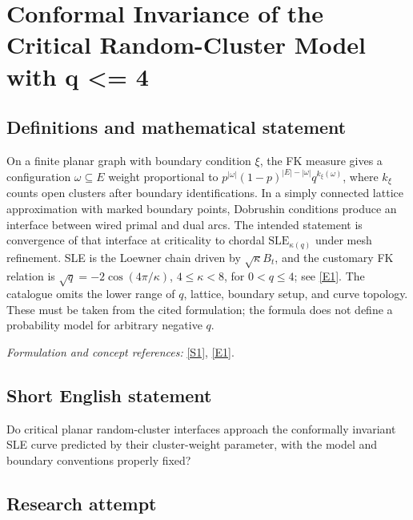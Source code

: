 \documentclass[11pt,a4paper]{article}
\newcommand{\sref}[2]{\hyperlink{source:#1:#2}{[S#2]}}
\newcommand{\eref}[2]{\hyperlink{extra:#1:#2}{[E#2]}}
\newif\ifshowcatalogue
\newcommand{\cataloguescope}[1]{\ifshowcatalogue
 \paragraph{Exact scope in the supplied catalogue.}
 \begin{quote}\small #1\end{quote}\fi}
\numberwithin{equation}{section}
\begin{document}
\setcounter{section}{0}
\clearpage
\section*{\texorpdfstring{Conformal Invariance of the Critical Random-Cluster Model with q <= 4}{Conformal Invariance of the Critical Random-Cluster Model with q <= 4}}\label{statement}
\subsection{Definitions and mathematical statement}
On a finite planar graph with boundary condition $\xi$, the FK measure gives a configuration $\omega\subseteq E$ weight proportional to
$p^{|\omega|}(1-p)^{|E|-|\omega|}q^{k_\xi(\omega)}$, where $k_\xi$ counts open clusters after boundary identifications. In a simply connected lattice approximation with marked boundary points, Dobrushin conditions produce an interface between wired primal and dual arcs. The intended statement is convergence of that interface at criticality to chordal $\mathrm{SLE}_{\kappa(q)}$ under mesh refinement. SLE is the Loewner chain driven by $\sqrt\kappa B_t$, and the customary FK relation is $\sqrt q=-2\cos(4\pi/\kappa)$, $4\le\kappa<8$, for $0<q\le4$; see \eref{statement}{1}. The catalogue omits the lower range of $q$, lattice, boundary setup, and curve topology. These must be taken from the cited formulation; the formula does not define a probability model for arbitrary negative $q$.
\par\smallskip\textit{Formulation and concept references:} \sref{statement}{1}, \eref{statement}{1}.
\cataloguescope{Prove that the exploration path of the critical random-cluster (FK) model with q <= 4 converges in distribution to a Schramm-Loewner evolution SLE\_\{kappa(q)\} as the mesh size goes to zero, i.e., the scaling limit is conformally invariant.}
\subsection{Short English statement}
Do critical planar random-cluster interfaces approach the conformally invariant SLE curve predicted by their cluster-weight parameter, with the model and boundary conventions properly fixed?
\subsection{Research attempt}
\end{document}
